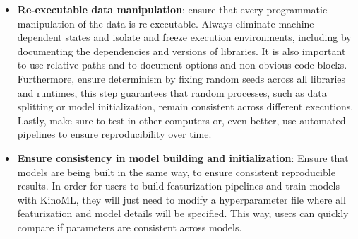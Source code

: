 \documentclass[9pt,lessons, pubversion]{livecoms}
\begin{document}
\begin{itemize}



\item \textbf{Re-executable data manipulation}: ensure that every programmatic manipulation of the data is re-executable. Always eliminate machine-dependent states and isolate and freeze execution environments, including by documenting the dependencies and versions of libraries. It is also important to use relative paths and to document options and non-obvious code blocks. Furthermore, ensure determinism by fixing random seeds across all libraries and runtimes, this step guarantees that random processes, such as data splitting or model initialization, remain consistent across different executions. Lastly, make sure to test in other computers or, even better, use automated pipelines to ensure reproducibility over time.


\item\textbf{Ensure consistency in model building and initialization}: Ensure that models are being built in the same way, to ensure consistent reproducible results. In order for users to build featurization pipelines and train models with KinoML, they will just need to modify a hyperparameter file where all featurization and model details will be specified. This way, users can quickly compare if parameters are consistent across models.


\end{itemize}
\end{document}
